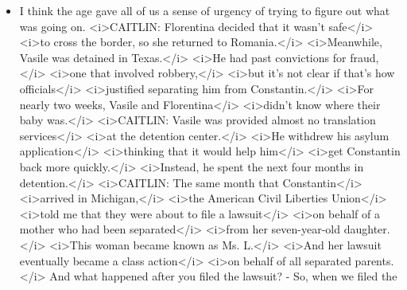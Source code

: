 \begin{itemize}
  \begin{itemize}
  \tightlist
  \item
    I think the age gave all of us a sense of urgency of trying to
    figure out what was going on. \textless{}i\textgreater{}CAITLIN:
    Florentina decided that it wasn't safe\textless{}/i\textgreater{}
    \textless{}i\textgreater{}to cross the border, so she returned to
    Romania.\textless{}/i\textgreater{}
    \textless{}i\textgreater{}Meanwhile, Vasile was detained in
    Texas.\textless{}/i\textgreater{} \textless{}i\textgreater{}He had
    past convictions for fraud,\textless{}/i\textgreater{}
    \textless{}i\textgreater{}one that involved
    robbery,\textless{}/i\textgreater{} \textless{}i\textgreater{}but
    it's not clear if that's how officials\textless{}/i\textgreater{}
    \textless{}i\textgreater{}justified separating him from
    Constantin.\textless{}/i\textgreater{} \textless{}i\textgreater{}For
    nearly two weeks, Vasile and Florentina\textless{}/i\textgreater{}
    \textless{}i\textgreater{}didn't know where their baby
    was.\textless{}/i\textgreater{} \textless{}i\textgreater{}CAITLIN:
    Vasile was provided almost no translation
    services\textless{}/i\textgreater{} \textless{}i\textgreater{}at the
    detention center.\textless{}/i\textgreater{}
    \textless{}i\textgreater{}He withdrew his asylum
    application\textless{}/i\textgreater{}
    \textless{}i\textgreater{}thinking that it would help
    him\textless{}/i\textgreater{} \textless{}i\textgreater{}get
    Constantin back more quickly.\textless{}/i\textgreater{}
    \textless{}i\textgreater{}Instead, he spent the next four months in
    detention.\textless{}/i\textgreater{}
    \textless{}i\textgreater{}CAITLIN: The same month that
    Constantin\textless{}/i\textgreater{}
    \textless{}i\textgreater{}arrived in
    Michigan,\textless{}/i\textgreater{} \textless{}i\textgreater{}the
    American Civil Liberties Union\textless{}/i\textgreater{}
    \textless{}i\textgreater{}told me that they were about to file a
    lawsuit\textless{}/i\textgreater{} \textless{}i\textgreater{}on
    behalf of a mother who had been separated\textless{}/i\textgreater{}
    \textless{}i\textgreater{}from her seven-year-old
    daughter.\textless{}/i\textgreater{} \textless{}i\textgreater{}This
    woman became known as Ms. L.\textless{}/i\textgreater{}
    \textless{}i\textgreater{}And her lawsuit eventually became a class
    action\textless{}/i\textgreater{} \textless{}i\textgreater{}on
    behalf of all separated parents.\textless{}/i\textgreater{} And what
    happened after you filed the lawsuit? - So, when we filed the

\end{itemize}
\end{itemize}
